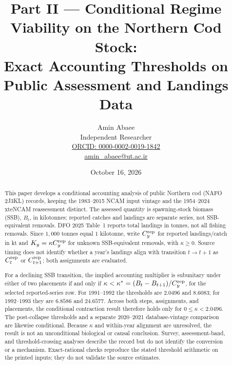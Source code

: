 \documentclass[10pt,twocolumn]{article}
\theoremstyle{plain}
\theoremstyle{remark}
\begin{document}
\title{Part II --- Conditional Regime Viability on the Northern Cod Stock:\\
Exact Accounting Thresholds on Public Assessment and Landings Data}
\author{Amin Abaee\\[0.35em]
{\small Independent Researcher}\\[0.55em]
{\small\href{https://orcid.org/0000-0002-0019-1842}{ORCID: 0000-0002-0019-1842}}\\[0.3em]
{\small\href{mailto:amin\_abaee@ut.ac.ir}{amin\_abaee@ut.ac.ir}}}
\date{October 16, 2026}
\maketitle

\begin{abstract}
This paper develops a conditional accounting analysis of public Northern cod (NAFO 2J3KL) records, keeping the 1983--2015 NCAM input vintage and the 1954--2024 xteNCAM reassessment distinct. The assessed quantity is spawning-stock biomass (SSB), \(B_t\), in kilotonnes; reported catches and landings are separate series, not SSB-equivalent removals. DFO 2025 Table~1 reports total landings in tonnes, not all fishing removals. Since \(1{,}000\) tonnes equal \(1\) kilotonne, write \(C_y^{\rm rep}\) for reported landings/catch in kt and \(K_y=\kappa C_y^{\rm rep}\) for unknown SSB-equivalent removals, with \(\kappa\ge0\). Source timing does not identify whether a year's landings align with transition \(t\to t+1\) as \(C_t^{\rm rep}\) or \(C_{t+1}^{\rm rep}\); both assignments are evaluated.

For a declining SSB transition, the implied accounting multiplier is subunitary under either of two placements if and only if \(\kappa<\kappa^*=(B_t-B_{t+1})/C_y^{\rm rep}\), for the selected reported-series row. For 1991--1992 the thresholds are \(2.0496\) and \(8.6083\); for 1992--1993 they are \(6.8586\) and \(24.6577\). Across both steps, assignments, and placements, the conditional contraction result therefore holds only for \(0\le\kappa<2.0496\). The post-collapse thresholds and a separate 2020--2021 database-vintage comparison are likewise conditional. Because \(\kappa\) and within-year alignment are unresolved, the result is not an unconditional biological or causal conclusion. Survey, assessment-band, and threshold-crossing analyses describe the record but do not identify the conversion or a mechanism. Exact-rational checks reproduce the stated threshold arithmetic on the printed inputs; they do not validate the source estimates.
\end{abstract}
\end{document}
